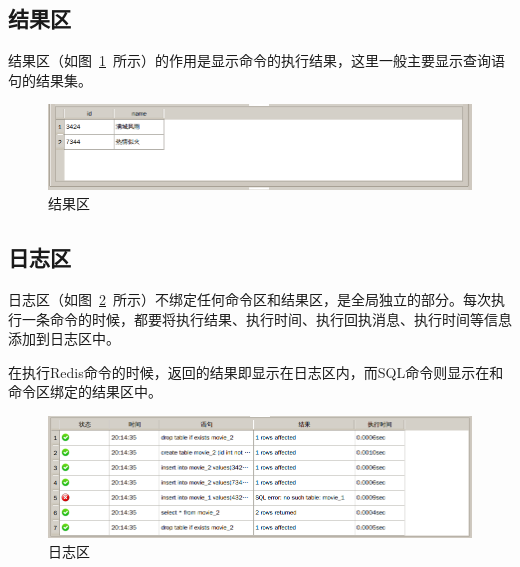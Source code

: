 \documentclass{zjutthesis}
\begin{document}
\subsection{结果区}
结果区（如图~\ref{fig:ResultPart}~所示）的作用是显示命令的执行结果，这里一般主要显示查询语句的结果集。
\begin{figure}[H]
\centering
\includegraphics[width=\textwidth]{ResultPart}
\caption{结果区}\label{fig:ResultPart}
\vspace{\baselineskip} %
\end{figure}

\subsection{日志区}
日志区（如图~\ref{fig:LoggingPart}~所示）不绑定任何命令区和结果区，是全局独立的部分。每次执行一条命令的时候，都要将执行结果、执行时间、执行回执消息、执行时间等信息添加到日志区中。

在执行Redis命令的时候，返回的结果即显示在日志区内，而SQL命令则显示在和命令区绑定的结果区中。

\begin{figure}[H]
\centering
\includegraphics[width=\textwidth]{LoggingPart}
\caption{日志区}\label{fig:LoggingPart}
\vspace{\baselineskip} %
\end{figure}
\end{document}
